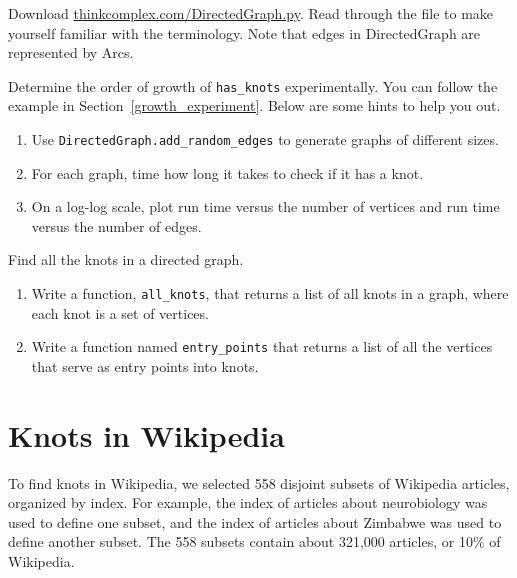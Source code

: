 \documentclass[10pt]{book}
\begin{document}
\begin{exercise}

Download \url{thinkcomplex.com/DirectedGraph.py}.
Read through the file to make yourself familiar with
the terminology. Note that edges in DirectedGraph are represented by
Arcs.

Determine the order of growth of \verb"has_knots" experimentally. You
can follow the example in Section~\ref{growth_experiment}. Below are
some hints to help you out.

\begin{enumerate}

 \item Use \verb"DirectedGraph.add_random_edges" to generate graphs of
   different sizes.

\item For each graph, time how long it takes to check if it has a knot.

\item On a log-log scale, plot run time versus
  the number of vertices and run time versus the number of edges.

\end{enumerate}

\end{exercise}

\begin{exercise}
Find all the knots in a directed graph.

\begin{enumerate}
 \item Write a function, \verb"all_knots", that returns a list of all
   knots in a graph, where each knot is a set of vertices.

\item Write a function named \verb"entry_points" that returns a list
  of all the vertices that serve as entry points into knots.

\end{enumerate}

\end{exercise}

\section{Knots in Wikipedia}

To find knots in Wikipedia, we selected 558 disjoint subsets of
Wikipedia articles, organized by index. For example, the index of
articles about neurobiology was used to define one subset, and the
index of articles about Zimbabwe was used to define another
subset. The 558 subsets contain about 321,000 articles, or
10\% of Wikipedia.
\end{document}
